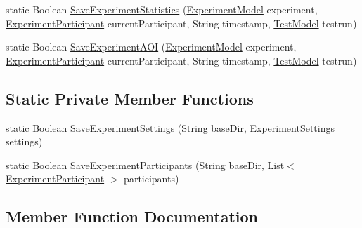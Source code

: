 \begin{DoxyCompactItemize}
\item 
static Boolean \hyperlink{class_web_analyzer_1_1_controller_1_1_export_controller_aac2a1b577a35a77d577c855c73dd5bf0}{Save\+Experiment\+Statistics} (\hyperlink{class_web_analyzer_1_1_models_1_1_base_1_1_experiment_model}{Experiment\+Model} experiment, \hyperlink{class_web_analyzer_1_1_models_1_1_base_1_1_experiment_participant}{Experiment\+Participant} current\+Participant, String timestamp, \hyperlink{class_web_analyzer_1_1_models_1_1_data_model_1_1_test_model}{Test\+Model} testrun)
\item 
static Boolean \hyperlink{class_web_analyzer_1_1_controller_1_1_export_controller_af284a2f2a413989ab50da390bfad5e35}{Save\+Experiment\+A\+O\+I} (\hyperlink{class_web_analyzer_1_1_models_1_1_base_1_1_experiment_model}{Experiment\+Model} experiment, \hyperlink{class_web_analyzer_1_1_models_1_1_base_1_1_experiment_participant}{Experiment\+Participant} current\+Participant, String timestamp, \hyperlink{class_web_analyzer_1_1_models_1_1_data_model_1_1_test_model}{Test\+Model} testrun)
\end{DoxyCompactItemize}
\subsection*{Static Private Member Functions}
\begin{DoxyCompactItemize}
\item 
static Boolean \hyperlink{class_web_analyzer_1_1_controller_1_1_export_controller_a24897eb8742a86b8d8873821baec50c6}{Save\+Experiment\+Settings} (String base\+Dir, \hyperlink{class_web_analyzer_1_1_models_1_1_settings_model_1_1_experiment_settings}{Experiment\+Settings} settings)
\item 
static Boolean \hyperlink{class_web_analyzer_1_1_controller_1_1_export_controller_a08b47c29f0fc8ab174158615747b6fa0}{Save\+Experiment\+Participants} (String base\+Dir, List$<$ \hyperlink{class_web_analyzer_1_1_models_1_1_base_1_1_experiment_participant}{Experiment\+Participant} $>$ participants)
\end{DoxyCompactItemize}


\subsection{Member Function Documentation}
\hypertarget{class_web_analyzer_1_1_controller_1_1_export_controller_a4b85a3cd4921ac619d484d0c3d2b031b}{}
